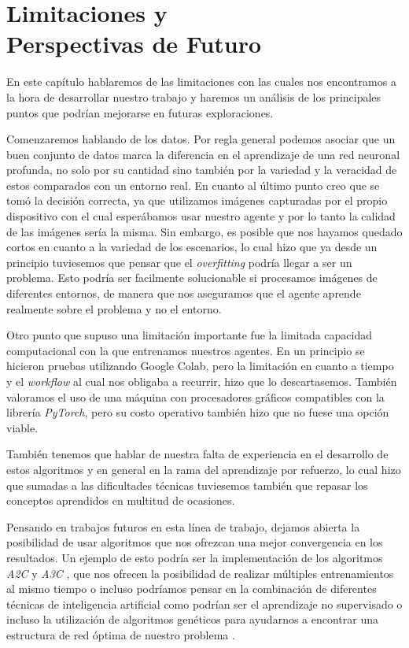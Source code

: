 
\cleardoublepage

\chapter{Limitaciones y\\ Perspectivas de Futuro}
\label{limitaciones-y-futuro}

En este capítulo hablaremos de las limitaciones con las cuales nos encontramos a la hora de desarrollar nuestro trabajo y haremos un análisis de los principales puntos que podrían mejorarse en futuras exploraciones.
\medskip

Comenzaremos hablando de los datos. Por regla general podemos asociar que un buen conjunto de datos marca la diferencia en el aprendizaje de una red neuronal profunda, no solo por su cantidad sino también por la variedad y la veracidad de estos comparados con un entorno real. En cuanto al último punto creo que se tomó la decisión correcta, ya que utilizamos imágenes capturadas por el propio dispositivo con el cual esperábamos usar nuestro agente y por lo tanto la calidad de las imágenes sería la misma. Sin embargo, es posible que nos hayamos quedado cortos en cuanto a la variedad de los escenarios, lo cual hizo que ya desde un principio tuviesemos que pensar que el \textit{overfitting} podría llegar a ser un problema. Esto podría ser facilmente solucionable si procesamos imágenes de diferentes entornos, de manera que nos aseguramos que el agente aprende realmente sobre el problema y no el entorno.
\medskip

Otro punto que supuso una limitación importante fue la limitada capacidad computacional con la que entrenamos nuestros agentes. En un principio se hicieron pruebas utilizando Google Colab, pero la limitación en cuanto a tiempo y el \textit{workflow} al cual nos obligaba a recurrir, hizo que lo descartasemos. También valoramos el uso de una máquina con procesadores gráficos compatibles con la librería \textit{PyTorch}, pero su costo operativo también hizo que no fuese una opción viable.
\medskip

También tenemos que hablar de nuestra falta de experiencia en el desarrollo de estos algoritmos y en general en la rama del aprendizaje por refuerzo, lo cual hizo que sumadas a las dificultades técnicas tuviesemos también que repasar los conceptos aprendidos en multitud de ocasiones.
\medskip

Pensando en trabajos futuros en esta línea de trabajo, dejamos abierta la posibilidad de usar algoritmos que nos ofrezcan una mejor convergencia en los resultados. Un ejemplo de esto podría ser la implementación de los algoritmos \textit{A2C} y \textit{A3C} \citep{DBLP:journals/corr/MnihBMGLHSK16}, que nos ofrecen la posibilidad de realizar múltiples entrenamientos al mismo tiempo o incluso podríamos pensar en la combinación de diferentes técnicas de inteligencia artificial como podrían ser el aprendizaje no supervisado o incluso la utilización de algoritmos genéticos para ayudarnos a encontrar una estructura de red óptima de nuestro problema \citep{cai2018efficient}. 